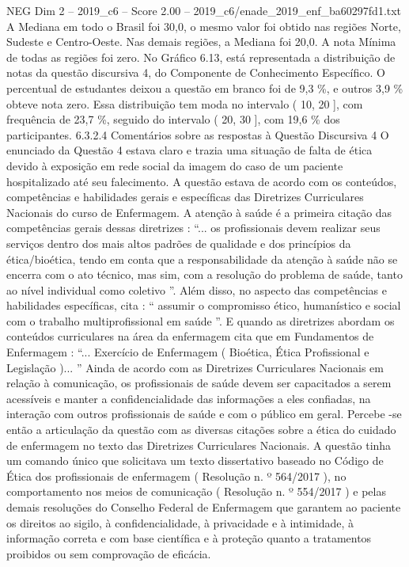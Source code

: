 \begin{textsample}{NEG Dim 2 – 2019\_c6 – Score 2.00 – 2019\_c6/enade\_2019\_enf\_ba60297fd1.txt}
A Mediana em todo o Brasil foi 30,0, o mesmo valor foi obtido nas regiões Norte, Sudeste e Centro-Oeste.
Nas demais regiões, a Mediana foi 20,0.
A nota Mínima de todas as regiões foi zero.
No Gráfico 6.13, está representada a distribuição de notas da questão discursiva 4, do Componente de Conhecimento Específico.
O percentual de estudantes deixou a questão em branco foi de 9,3 \%, e outros 3,9 \% obteve nota zero.
Essa distribuição tem moda no intervalo ( 10, 20 ], com frequência de 23,7 \%, seguido do intervalo ( 20, 30 ], com 19,6 \% dos participantes. 6.3.2.4 Comentários sobre as respostas à Questão Discursiva 4 O enunciado da Questão 4 estava claro e trazia uma situação de falta de ética devido à exposição em rede social da imagem do caso de um paciente hospitalizado até seu falecimento.
A questão estava de acordo com os conteúdos, competências e habilidades gerais e específicas das Diretrizes Curriculares Nacionais do curso de Enfermagem.
A atenção à saúde é a primeira citação das competências gerais dessas diretrizes : “... os profissionais devem realizar seus serviços dentro dos mais altos padrões de qualidade e dos princípios da ética/bioética, tendo em conta que a responsabilidade da atenção à saúde não se encerra com o ato técnico, mas sim, com a resolução do problema de saúde, tanto ao nível individual como coletivo ”.
Além disso, no aspecto das competências e habilidades específicas, cita : “ assumir o compromisso ético, humanístico e social com o trabalho multiprofissional em saúde ”.
E quando as diretrizes abordam os conteúdos curriculares na área da enfermagem cita que em Fundamentos de Enfermagem : “...
Exercício de Enfermagem ( Bioética, Ética Profissional e Legislação )... ” Ainda de acordo com as Diretrizes Curriculares Nacionais em relação à comunicação, os profissionais de saúde devem ser capacitados a serem acessíveis e manter a confidencialidade das informações a eles confiadas, na interação com outros profissionais de saúde e com o público em geral.
Percebe -se então a articulação da questão com as diversas citações sobre a ética do cuidado de enfermagem no texto das Diretrizes Curriculares Nacionais.
A questão tinha um comando único que solicitava um texto dissertativo baseado no Código de Ética dos profissionais de enfermagem ( Resolução n. º 564/2017 ), no comportamento nos meios de comunicação ( Resolução n. º 554/2017 ) e pelas demais resoluções do Conselho Federal de Enfermagem que garantem ao paciente os direitos ao sigilo, à confidencialidade, à privacidade e à intimidade, à informação correta e com base científica e à proteção quanto a tratamentos proibidos ou sem comprovação de eficácia.

\end{textsample}

